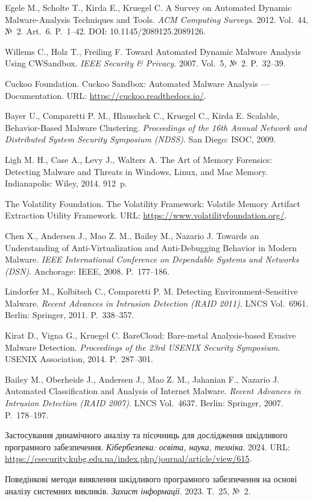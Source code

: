 
 Egele M., Scholte T., Kirda E., Kruegel C. A Survey on Automated Dynamic Malware-Analysis Techniques and Tools. \emph{ACM Computing Surveys}. 2012. Vol.~44, №~2. Art.~6. P.~1--42. DOI: 10.1145/2089125.2089126.

 Willems C., Holz T., Freiling F. Toward Automated Dynamic Malware Analysis Using CWSandbox. \emph{IEEE Security \& Privacy}. 2007. Vol.~5, №~2. P.~32--39.

 Cuckoo Foundation. Cuckoo Sandbox: Automated Malware Analysis --- Documentation. URL: \url{https://cuckoo.readthedocs.io/}.

 Bayer U., Comparetti P. M., Hlauschek C., Kruegel C., Kirda E. Scalable, Behavior-Based Malware Clustering. \emph{Proceedings of the 16th Annual Network and Distributed System Security Symposium (NDSS)}. San Diego: ISOC, 2009.

 Ligh M. H., Case A., Levy J., Walters A. The Art of Memory Forensics: Detecting Malware and Threats in Windows, Linux, and Mac Memory. Indianapolis: Wiley, 2014. 912~p.

 The Volatility Foundation. The Volatility Framework: Volatile Memory Artifact Extraction Utility Framework. URL: \url{https://www.volatilityfoundation.org/}.

 Chen X., Andersen J., Mao Z. M., Bailey M., Nazario J. Towards an Understanding of Anti-Virtualization and Anti-Debugging Behavior in Modern Malware. \emph{IEEE International Conference on Dependable Systems and Networks (DSN)}. Anchorage: IEEE, 2008. P.~177--186.

 Lindorfer M., Kolbitsch C., Comparetti P. M. Detecting Environment-Sensitive Malware. \emph{Recent Advances in Intrusion Detection (RAID 2011)}. LNCS Vol.~6961. Berlin: Springer, 2011. P.~338--357.

 Kirat D., Vigna G., Kruegel C. BareCloud: Bare-metal Analysis-based Evasive Malware Detection. \emph{Proceedings of the 23rd USENIX Security Symposium}. USENIX Association, 2014. P.~287--301.

 Bailey M., Oberheide J., Andersen J., Mao Z. M., Jahanian F., Nazario J. Automated Classification and Analysis of Internet Malware. \emph{Recent Advances in Intrusion Detection (RAID 2007)}. LNCS Vol.~4637. Berlin: Springer, 2007. P.~178--197.

 Застосування динамічного аналізу та пісочниць для дослідження шкідливого програмного забезпечення. \emph{Кібербезпека: освіта, наука, техніка}. 2024. URL: \url{https://csecurity.kubg.edu.ua/index.php/journal/article/view/615}.

 Поведінкові методи виявлення шкідливого програмного забезпечення на основі аналізу системних викликів. \emph{Захист інформації}. 2023. Т.~25, №~2.
